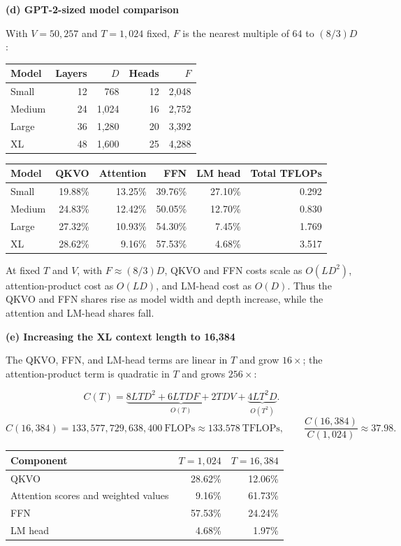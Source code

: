 \documentclass[10pt,letterpaper]{article}
\begin{document}
\medskip\noindent\textbf{(d) GPT-2-sized model comparison}\par
With $V=50{,}257$ and $T=1{,}024$ fixed, $F$ is the nearest multiple of 64 to $(8/3)D$:\par
\begin{center}
\begin{tabular}{lrrrr}
\hline
Model & Layers & $D$ & Heads & $F$\\
\hline
Small & 12 & 768 & 12 & 2,048\\
Medium & 24 & 1,024 & 16 & 2,752\\
Large & 36 & 1,280 & 20 & 3,392\\
XL & 48 & 1,600 & 25 & 4,288\\
\hline
\end{tabular}
\end{center}
\begin{center}
\begin{tabular}{lrrrrr}
\hline
Model & QKVO & Attention & FFN & LM head & Total TFLOPs\\
\hline
Small & 19.88\% & 13.25\% & 39.76\% & 27.10\% & 0.292\\
Medium & 24.83\% & 12.42\% & 50.05\% & 12.70\% & 0.830\\
Large & 27.32\% & 10.93\% & 54.30\% & 7.45\% & 1.769\\
XL & 28.62\% & 9.16\% & 57.53\% & 4.68\% & 3.517\\
\hline
\end{tabular}
\end{center}
At fixed $T$ and $V$, with $F\approx(8/3)D$, QKVO and FFN costs scale as $O(LD^2)$, attention-product cost as $O(LD)$, and LM-head cost as $O(D)$. Thus the QKVO and FFN shares rise as model width and depth increase, while the attention and LM-head shares fall.\par
\newpage
\noindent\textbf{(e) Increasing the XL context length to 16,384}\par
The QKVO, FFN, and LM-head terms are linear in $T$ and grow $16\times$; the attention-product term is quadratic in $T$ and grows $256\times$:\par
\[
C(T)=\underbrace{8LTD^2+6LTDF+2TDV}_{O(T)}
+\underbrace{4LT^2D}_{O(T^2)}.
\]
\[
C(16{,}384)=\boxed{133{,}577{,}729{,}638{,}400}\ \text{FLOPs}
\approx 133.578\ \text{TFLOPs},\qquad
\frac{C(16{,}384)}{C(1{,}024)}\approx\boxed{37.98}.
\]
\begin{center}
\begin{tabular}{lrr}
\hline
Component & $T=1{,}024$ & $T=16{,}384$\\
\hline
QKVO & 28.62\% & 12.06\%\\
Attention scores and weighted values & 9.16\% & 61.73\%\\
FFN & 57.53\% & 24.24\%\\
LM head & 4.68\% & 1.97\%\\
\hline
\end{tabular}
\end{center}
\end{document}

